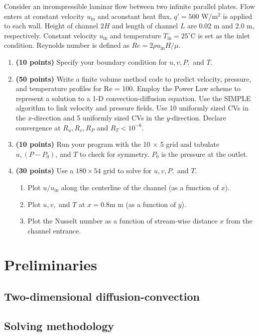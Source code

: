 \documentclass{article}
\begin{document}
Consider an incompressible laminar flow between two infinite parallel plates. Flow enters at constant velocity $u_\mathrm{in}$ and aconstant heat flux, $q' = 500$ W/m$^2$ is applied to each wall. Height of channel $2H$ and length of channel $L$ are 0.02 m and 2.0 m, respectively. Constant velocity $u_\mathrm{in}$ and temperature $T_\mathrm{in} = 25^\circ$C is set as the inlet condition. Reynolds number is defined as $Re = 2 \rho u_\mathrm{in} H / \mu$.
\begin{enumerate}
	\item \textbf{(10 points)} Specify your boundary condition for $u, v, P,$ and $T$.
	\item \textbf{(50 points)} Write a finite volume method code to predict velocity, pressure, and temperature profiles for Re = 100. Employ the Power Law scheme to represent a solution to a 1-D convection-diffusion equation. Use the SIMPLE algorithm to link velocity and pressure fields. Use 10 uniformly sized CVs in the $x$-direction and 5 uniformly sized CVs in the $y$-direction. Declare convergence at $R_u, R_v, R_P$ and $R_T < 10^{-6}$. 
	\item \textbf{(10 points)} Run your program with the 10 $\times$ 5 grid and tabulate $u, (P - P_0)$, and $T$ to check for symmetry. $P_0$ is the pressure at the outlet.
	\item \textbf{(30 points)} Use a $180 \times 54$ grid to solve for $u, v, P,$ and $T$.
	\begin{enumerate}[label=(\alph*)]
		\item Plot $u/u_\mathrm{in}$ along the centerline of the channel (as a function of $x$).
		\item Plot $u, v,$ and $T$ at $x = 0.8$m m (as a function of $y$).
		\item Plot the Nusselt number as a function of stream-wise distance $x$ from the channel entrance.
	\end{enumerate}
\end{enumerate}

\section{Preliminaries}

\subsection{Two-dimensional diffusion-convection}

\subsection{Solving methodology}
\end{document}
